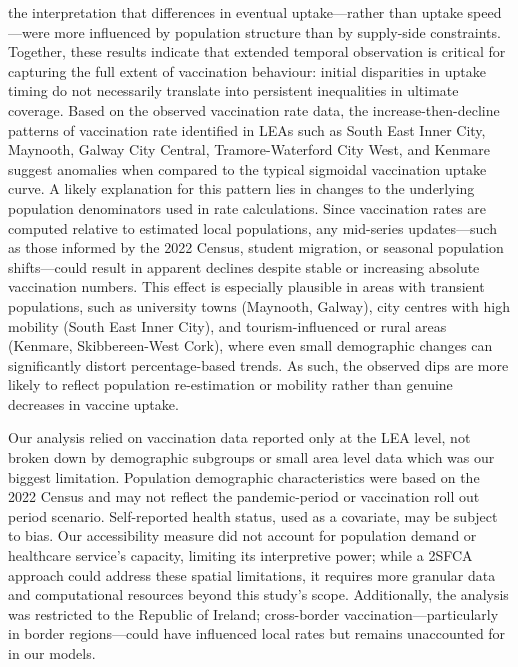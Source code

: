 \documentclass{article}
\begin{document}
the interpretation that differences in eventual uptake---rather than
uptake speed---were more influenced by population structure than by
supply-side constraints. Together, these results indicate that extended
temporal observation is critical for capturing the full extent of
vaccination behaviour: initial disparities in uptake timing do not
necessarily translate into persistent inequalities in ultimate coverage.
Based on the observed vaccination rate data, the increase-then-decline
patterns of vaccination rate identified in LEAs such as South East Inner
City, Maynooth, Galway City Central, Tramore-Waterford City West, and
Kenmare suggest anomalies when compared to the typical sigmoidal
vaccination uptake curve. A likely explanation for this pattern lies in
changes to the underlying population denominators used in rate
calculations. Since vaccination rates are computed relative to estimated
local populations, any mid-series updates---such as those informed by
the 2022 Census, student migration, or seasonal population
shifts---could result in apparent declines despite stable or increasing
absolute vaccination numbers. This effect is especially plausible in
areas with transient populations, such as university towns (Maynooth,
Galway), city centres with high mobility (South East Inner City), and
tourism-influenced or rural areas (Kenmare, Skibbereen-West Cork), where
even small demographic changes can significantly distort
percentage-based trends. As such, the observed dips are more likely to
reflect population re-estimation or mobility rather than genuine
decreases in vaccine uptake.

Our analysis relied on vaccination data reported only at the LEA level,
not broken down by demographic subgroups or small area level data which
was our biggest limitation. Population demographic characteristics were
based on the 2022 Census and may not reflect the pandemic-period or
vaccination roll out period scenario. Self-reported health status, used
as a covariate, may be subject to bias. Our accessibility measure did
not account for population demand or healthcare service's capacity,
limiting its interpretive power; while a 2SFCA approach could address
these spatial limitations, it requires more granular data and
computational resources beyond this study's scope. Additionally, the
analysis was restricted to the Republic of Ireland; cross-border
vaccination---particularly in border regions---could have influenced
local rates but remains unaccounted for in our models.



\end{document}
